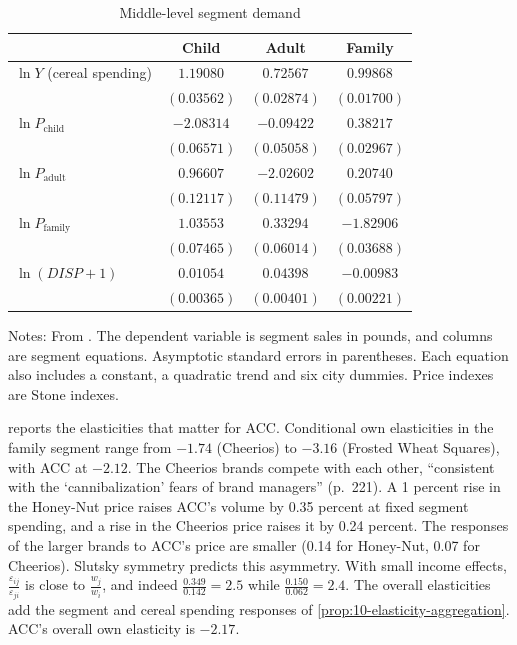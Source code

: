 \begin{table}[htbp]
\centering
\caption{Middle-level segment demand}\label{tab:10-hausman-segment}
\begin{threeparttable}
\begin{tabular}{@{}lccc@{}}
\toprule
 & Child & Adult & Family \\
\midrule
$\ln Y$ (cereal spending) & $1.19080$ & $0.72567$ & $0.99868$ \\
 & $(0.03562)$ & $(0.02874)$ & $(0.01700)$ \\
$\ln P_{\text{child}}$ & $-2.08314$ & $-0.09422$ & $0.38217$ \\
 & $(0.06571)$ & $(0.05058)$ & $(0.02967)$ \\
$\ln P_{\text{adult}}$ & $0.96607$ & $-2.02602$ & $0.20740$ \\
 & $(0.12117)$ & $(0.11479)$ & $(0.05797)$ \\
$\ln P_{\text{family}}$ & $1.03553$ & $0.33294$ & $-1.82906$ \\
 & $(0.07465)$ & $(0.06014)$ & $(0.03688)$ \\
$\ln(DISP + 1)$ & $0.01054$ & $0.04398$ & $-0.00983$ \\
 & $(0.00365)$ & $(0.00401)$ & $(0.00221)$ \\
\bottomrule
\end{tabular}
\begin{tablenotes}[flushleft]\footnotesize
\item Notes: From \citet[Table 5.4]{Hausman1997}. The dependent variable is segment sales in pounds, and
columns are segment equations. Asymptotic standard errors in parentheses. Each equation also includes a
constant, a quadratic trend and six city dummies. Price indexes are Stone indexes.
\end{tablenotes}
\end{threeparttable}
\end{table}

 reports the elasticities that matter for ACC. Conditional own elasticities in the
family segment range from $-1.74$ (Cheerios) to $-3.16$ (Frosted Wheat Squares), with ACC at $-2.12$. The
Cheerios brands compete with each other, ``consistent with the `cannibalization' fears of brand managers''
(p.~221). A 1 percent rise in the Honey-Nut price raises ACC's volume by 0.35 percent at fixed segment
spending, and a rise in the Cheerios price raises it by 0.24 percent. The responses of the larger brands to
ACC's price are smaller (0.14 for Honey-Nut, 0.07 for Cheerios). Slutsky symmetry predicts this asymmetry.
With small income effects, $\frac{\varepsilon_{ij}}{\varepsilon_{ji}}$ is close to $\frac{w_j}{w_i}$, and indeed
$\frac{0.349}{0.142} = 2.5$ while $\frac{0.150}{0.062} = 2.4$. The overall elasticities add the segment and cereal spending responses of
\cref{prop:10-elasticity-aggregation}. ACC's overall own elasticity is $-2.17$.

